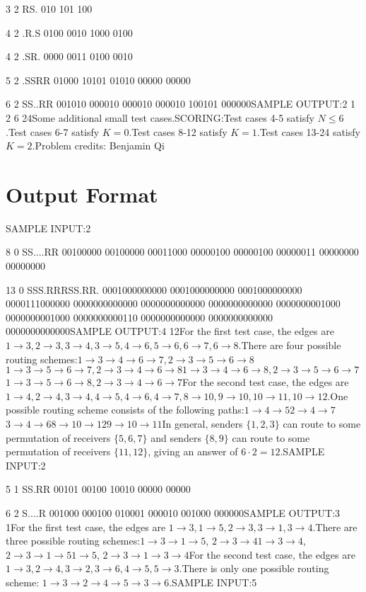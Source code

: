 \documentclass[12pt]{article}
\begin{document}
3 2
RS.
010
101
100

4 2
.R.S
0100
0010
1000
0100

4 2
.SR.
0000
0011
0100
0010

5 2
.SSRR
01000
10101
01010
00000
00000

6 2
SS..RR
001010
000010
000010
000010
100101
000000SAMPLE OUTPUT:2
1
2
6
24Some additional small test cases.SCORING:Test cases 4-5 satisfy $N\le 6$.Test cases 6-7 satisfy $K=0$.Test cases 8-12 satisfy $K=1$.Test cases 13-24 satisfy $K=2$.Problem credits: Benjamin Qi

\section*{Output Format}
SAMPLE INPUT:2

8 0
SS....RR
00100000
00100000
00011000
00000100
00000100
00000011
00000000
00000000

13 0
SSS.RRRSS.RR.
0001000000000
0001000000000
0001000000000
0000111000000
0000000000000
0000000000000
0000000000000
0000000001000
0000000001000
0000000000110
0000000000000
0000000000000
0000000000000SAMPLE OUTPUT:4
12For the first test case, the edges are
$1\to 3, 2\to 3, 3\to 4, 3\to 5, 4\to 6, 5\to 6, 6\to 7, 6\to 8$.There are four possible routing schemes:$1\to 3\to 4\to 6\to 7, 2\to 3\to 5\to 6\to 8$$1\to 3\to 5\to 6\to 7, 2\to 3\to 4\to 6\to 8$$1\to 3\to 4\to 6\to 8, 2\to 3\to 5\to 6\to 7$$1\to 3\to 5\to 6\to 8, 2\to 3\to 4\to 6\to 7$For the second test case, the edges are
$1\to 4, 2\to 4, 3\to 4, 4\to 5,4\to 6,4\to 7, 8\to 10, 9\to 10, 10\to 11, 10\to 12$.One possible routing scheme consists of the following paths:$1\to 4\to 5$$2\to 4\to 7$$3\to 4\to 6$$8\to 10\to 12$$9\to 10\to 11$In general, senders $\{1,2,3\}$ can route to some permutation of receivers
$\{5,6,7\}$ and senders $\{8,9\}$ can route to some permutation of receivers
$\{11,12\}$, giving an answer of $6\cdot 2=12$.SAMPLE INPUT:2

5 1
SS.RR
00101
00100
10010
00000
00000

6 2
S....R
001000
000100
010001
000010
001000
000000SAMPLE OUTPUT:3
1For the first test case, the edges are $1\to 3, 1\to 5, 2\to 3, 3\to 1, 3\to 4$.There are three possible routing schemes:$1\to 3\to 1\to 5$, $2\to 3\to 4$$1\to 3\to 4$,
$2\to 3\to 1\to 5$$1\to 5$, $2\to 3\to 1\to 3\to 4$For the second test case, the edges are
$1\to 3, 2\to 4, 3\to 2,3\to 6, 4\to 5, 5\to 3$.There is only one possible routing scheme:
$1\to 3\to 2\to 4\to 5\to 3\to 6$.SAMPLE INPUT:5
\end{document}
